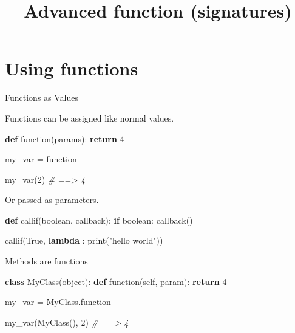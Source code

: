\documentclass[ignorenonframetext,]{beamer}
\title{Advanced function (signatures)}
\date{}
\newenvironment{Shaded}{}{}
\newcommand{\KeywordTok}[1]{\textcolor[rgb]{0.00,0.44,0.13}{\textbf{{#1}}}}
\newcommand{\DecValTok}[1]{\textcolor[rgb]{0.25,0.63,0.44}{{#1}}}
\newcommand{\StringTok}[1]{\textcolor[rgb]{0.25,0.44,0.63}{{#1}}}
\newcommand{\CommentTok}[1]{\textcolor[rgb]{0.38,0.63,0.69}{\textit{{#1}}}}
\newcommand{\VariableTok}[1]{\textcolor[rgb]{0.10,0.09,0.49}{{#1}}}
\newcommand{\ControlFlowTok}[1]{\textcolor[rgb]{0.00,0.44,0.13}{\textbf{{#1}}}}
\newcommand{\OperatorTok}[1]{\textcolor[rgb]{0.40,0.40,0.40}{{#1}}}
\newcommand{\BuiltInTok}[1]{{#1}}
\newcommand{\NormalTok}[1]{{#1}}
\begin{document}
\frame{\titlepage}

\section{Using functions}\label{using-functions}

\begin{frame}[fragile]{Functions as Values}

Functions can be assigned like normal values.

\begin{Shaded}
\begin{Highlighting}[]
\KeywordTok{def} \NormalTok{function(params):}
    \ControlFlowTok{return} \DecValTok{4}

\NormalTok{my_var }\OperatorTok{=} \NormalTok{function}

\NormalTok{my_var(}\DecValTok{2}\NormalTok{)  }\CommentTok{# ==> 4}
\end{Highlighting}
\end{Shaded}

\end{frame}

\begin{frame}[fragile]

Or passed as parameters.

\begin{Shaded}
\begin{Highlighting}[]
\KeywordTok{def} \NormalTok{callif(boolean, callback):}
    \ControlFlowTok{if} \NormalTok{boolean:}
        \NormalTok{callback()}

\NormalTok{callif(}\VariableTok{True}\NormalTok{, }\KeywordTok{lambda} \NormalTok{: }\BuiltInTok{print}\NormalTok{(}\StringTok{"hello world"}\NormalTok{))}
\end{Highlighting}
\end{Shaded}

\end{frame}

\begin{frame}[fragile]{Methods are functions}

\begin{Shaded}
\begin{Highlighting}[]
\KeywordTok{class} \NormalTok{MyClass(}\BuiltInTok{object}\NormalTok{):}
    \KeywordTok{def} \NormalTok{function(}\VariableTok{self}\NormalTok{, param):}
        \ControlFlowTok{return} \DecValTok{4}


\NormalTok{my_var }\OperatorTok{=} \NormalTok{MyClass.function}

\NormalTok{my_var(MyClass(), }\DecValTok{2}\NormalTok{)  }\CommentTok{# ==> 4}
\end{Highlighting}
\end{Shaded}

\end{frame}
\end{document}
